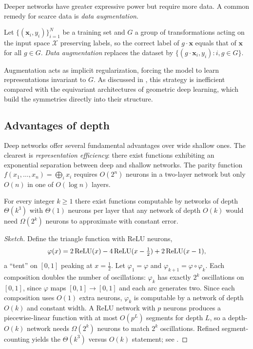 Deeper networks have greater expressive power but require more data. A common
remedy for scarce data is \emph{data augmentation}.

\begin{definition}
\label{def:found:augmentation}
Let $\{(\mathbf{x}_i, y_i)\}_{i=1}^N$ be a training set and $G$ a group of
transformations acting on the input space $\mathcal{X}$ preserving labels, so the
correct label of $g \cdot \mathbf{x}$ equals that of $\mathbf{x}$ for all
$g \in G$. \emph{Data augmentation} replaces the dataset by
$\{(g \cdot \mathbf{x}_i, y_i) : i, g \in G\}$.
\end{definition}

Augmentation acts as implicit regularization, forcing the model to learn
representations invariant to $G$. As discussed in , this strategy
is inefficient compared with the equivariant architectures of geometric deep
learning, which build the symmetries directly into their structure.

\subsection{Advantages of depth}
\label{sec:found:depth}

Deep networks offer several fundamental advantages over wide shallow ones. The
clearest is \emph{representation efficiency}: there exist functions exhibiting an
exponential separation between deep and shallow networks. The parity function
$f(x_1, \ldots, x_n) = \bigoplus_i x_i$ requires $O(2^n)$ neurons in a two-layer
network but only $O(n)$ in one of $O(\log n)$ layers.

\begin{theorem}
\label{thm:found:telgarsky}
For every integer $k \ge 1$ there exist functions computable by networks of depth
$\Theta(k^3)$ with $\Theta(1)$ neurons per layer that any network of depth
$O(k)$ would need $\Omega(2^k)$ neurons to approximate with constant error.
\end{theorem}

\begin{proof}[Sketch]
Define the triangle function with ReLU neurons,
\[
  \varphi(x) = 2\operatorname{ReLU}(x) - 4\operatorname{ReLU}(x - \tfrac12) + 2\operatorname{ReLU}(x - 1),
\]
a ``tent'' on $[0,1]$ peaking at $x = \tfrac12$. Let $\varphi_1 = \varphi$ and
$\varphi_{k+1} = \varphi \circ \varphi_k$. Each composition doubles the number of
oscillations: $\varphi_k$ has exactly $2^k$ oscillations on $[0,1]$, since
$\varphi$ maps $[0,1] \to [0,1]$ and each arc generates two. Since each
composition uses $O(1)$ extra neurons, $\varphi_k$ is computable by a network of
depth $O(k)$ and constant width. A ReLU network with $p$ neurons produces a
piecewise-linear function with at most $O(p^L)$ segments for depth $L$, so a
depth-$O(k)$ network needs $\Omega(2^k)$ neurons to match $2^k$ oscillations.
Refined segment-counting yields the $\Theta(k^3)$ versus $O(k)$ statement; see
\citet{telgarsky2016benefitsdepthneuralnetworks}.
\end{proof}

